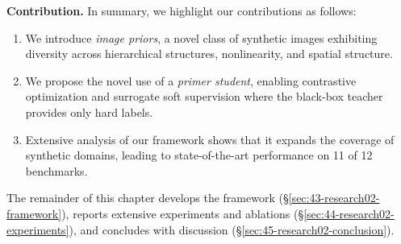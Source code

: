 \begin{foldable} %
  \textbf{Contribution.} In summary, we highlight our contributions as follows:
  \begin{enumerate}
    \item We introduce \textit{image priors}, a novel class of synthetic images exhibiting diversity across hierarchical structures, nonlinearity, and spatial structure.
    \item We propose the novel use of a \textit{primer student}, enabling contrastive optimization and surrogate soft supervision where the black-box teacher provides only hard labels.
    \item Extensive analysis of our framework shows that it expands the coverage of synthetic domains, leading to state-of-the-art performance on 11 of 12 benchmarks.
  \end{enumerate}
\end{foldable}

\begin{foldable}
  The remainder of this chapter develops the framework (\S\ref{sec:43-research02-framework}), reports extensive experiments and ablations (\S\ref{sec:44-research02-experiments}), and concludes with discussion (\S\ref{sec:45-research02-conclusion}).
\end{foldable}
